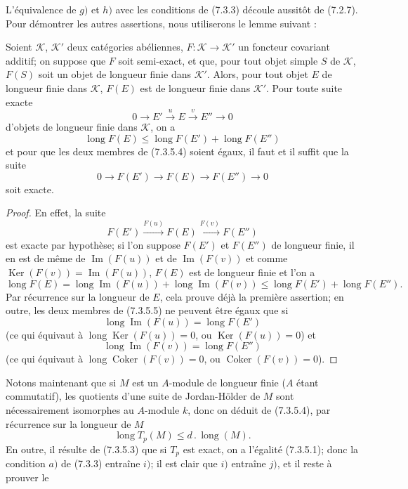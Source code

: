 L'équivalence de $g)$ et $h)$ avec les conditions de (7.3.3) découle aussitôt
de (7.2.7). Pour démontrer les autres assertions, nous utiliserons le lemme
suivant :

\begin{lemma}[7.3.5.3]
Soient $\mathcal K$, $\mathcal K'$ deux catégories abéliennes,
$F:\mathcal K\to\mathcal K'$ un foncteur
covariant additif; on suppose que $F$ soit semi-exact, et que, pour tout objet
simple $S$ de $\mathcal K$, $F(S)$ soit un objet de longueur finie dans
$\mathcal K'$. Alors, pour tout objet $E$ de longueur finie dans $\mathcal K$,
$F(E)$ est de longueur finie dans $\mathcal K'$. Pour toute suite exacte
\[
  0\longrightarrow E'\xrightarrow{u}E\xrightarrow{v}E''\longrightarrow0
\]
d'objets de longueur finie dans $\mathcal K$, on a
\[
  \operatorname{long}F(E)
  \leq
  \operatorname{long}F(E')+\operatorname{long}F(E'')
  \tag{7.3.5.4}\label{III.7.3.5.4.fr}
\]
et pour que les deux membres de (7.3.5.4) soient égaux, il faut et il suffit
que la suite
\[
  0\longrightarrow F(E')\longrightarrow F(E)\longrightarrow F(E'')
  \longrightarrow0
\]
soit exacte.
\end{lemma}

\begin{proof}
En effet, la suite
\[
  F(E')\xrightarrow{F(u)}F(E)\xrightarrow{F(v)}F(E'')
\]
est exacte par hypothèse; si l'on suppose $F(E')$ et $F(E'')$ de longueur
finie, il en est de même de $\operatorname{Im}(F(u))$ et de
$\operatorname{Im}(F(v))$ et comme
$\operatorname{Ker}(F(v))=\operatorname{Im}(F(u))$, $F(E)$ est de longueur
finie et l'on a
\[
  \operatorname{long}F(E)
  =
  \operatorname{long}\operatorname{Im}(F(u))
  +
  \operatorname{long}\operatorname{Im}(F(v))
  \leq
  \operatorname{long}F(E')+\operatorname{long}F(E'').
  \tag{7.3.5.5}\label{III.7.3.5.5.fr}
\]
Par récurrence sur la longueur de $E$, cela prouve déjà la première assertion;
en outre, les deux membres de (7.3.5.5) ne peuvent être égaux que si
\[
  \operatorname{long}\operatorname{Im}(F(u))=\operatorname{long}F(E')
\]
(ce qui équivaut à
$\operatorname{long}\operatorname{Ker}(F(u))=0$, ou
$\operatorname{Ker}(F(u))=0$) et
\[
  \operatorname{long}\operatorname{Im}(F(v))=\operatorname{long}F(E'')
\]
(ce qui équivaut à
$\operatorname{long}\operatorname{Coker}(F(v))=0$, ou
$\operatorname{Coker}(F(v))=0$).
\end{proof}

Notons maintenant que si $M$ est un $A$-module de longueur finie ($A$ étant
commutatif), les quotients d'une suite de Jordan-Hölder de $M$ sont
nécessairement isomorphes au $A$-module $k$, donc on déduit de (7.3.5.4), par
récurrence sur la longueur de $M$
\[
  \operatorname{long}T_p(M)\leq d\mathbin{.}\operatorname{long}(M).
  \tag{7.3.5.6}\label{III.7.3.5.6.fr}
\]
En outre, il résulte de (7.3.5.3) que si $T_p$ est exact, on a l'égalité
(7.3.5.1); donc la condition $a)$ de (7.3.3) entraîne $i)$; il est clair que
$i)$ entraîne $j)$, et il reste à prouver le

